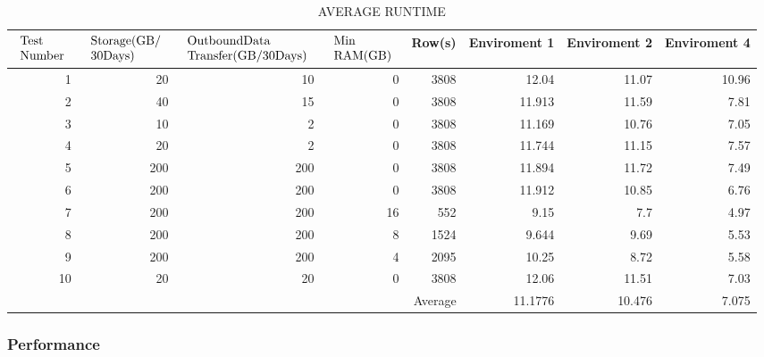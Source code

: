 \documentclass[journal]{IEEEtran}
\begin{document}
\begin{table*}[htbp]
\begin{center}\caption{AVERAGE RUNTIME } \label{table:avg_runtime}
\begin{tabular}{|r|r|r|r|r|r|r|r|}
\hline
\textbf{$\begin{array}{l}
{\rm{Test}}\\
{\rm{Number}}
\end{array}$} &  \textbf{$\begin{array}{l}
{\rm{Storage(GB/}}\\
{\rm{30 Days)}}
\end{array}$ } &  \textbf{$\begin{array}{l}
{\rm{Outbound Data}}\\
{\rm{Transfer(GB/30 Days)}}
\end{array}$ }&  \textbf{$\begin{array}{l}
{\rm{Min}}\\
{\rm{RAM(GB) }}
\end{array}$}&  Row(s) &  Enviroment 1&  Enviroment 2&  Enviroment 4\\
\hline 1 & 20 & 10 & 0 & 3808 & 12.04 & 11.07 & 10.96   \\
\hline 2 & 40 & 15 & 0 & 3808 & 11.913 & 11.59 & 7.81\\
\hline 3 & 10 & 2 & 0 & 3808 & 11.169 & 10.76 & 7.05 \\
\hline 4 & 20 & 2 & 0  & 3808 & 11.744 & 11.15 & 7.57 \\
\hline 5 & 200 & 200 & 0  & 3808 & 11.894 & 11.72 & 7.49 \\
\hline 6 & 200 & 200 & 0  & 3808 & 11.912 & 10.85 & 6.76 \\
\hline 7 & 200 & 200 & 16  & 552 & 9.15 & 7.7 & 4.97 \\
\hline 8 & 200 & 200 & 8  & 1524 & 9.644& 9.69 & 5.53 \\
\hline 9 & 200 & 200 & 4  & 2095 & 10.25 & 8.72 & 5.58 \\
\hline 10 & 20 & 20 & 0  & 3808 & 12.06 & 11.51 & 7.03 \\
\hline \multicolumn{5}{|r|}{Average} & 11.1776 & 10.476 & 7.075\\
\hline
\end{tabular}
\end{center}
\end{table*} 


\subsubsection{Performance}
\end{document}
